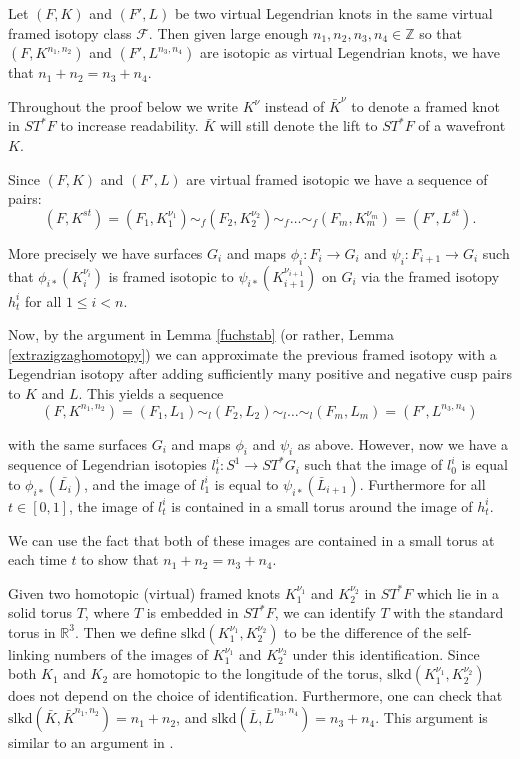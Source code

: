 \begin{thm}\label{sameframediso}
Let $(F, K)$ and $(F', L)$ be two virtual Legendrian knots in the same virtual framed isotopy class $\mathcal{F}$. Then given large enough $n_1, n_2, n_3, n_4 \in \mathbb{Z}$ so that $(F, K^{n_1,n_2})$ and $(F',L^{n_3, n_4})$ are isotopic as virtual Legendrian knots, we have that $n_1+n_2 = n_3+n_4$.
\end{thm}

\pp
Throughout the proof below we write $K^\nu$ instead of $\bar{K}^\nu$ to denote a framed knot in $ST^*F$ to increase readability.  $\bar{K}$ will still denote the lift to $ST^*F$ of a wavefront $K$.

Since $(F,K)$ and $(F',L)$ are virtual framed isotopic we have a sequence of pairs:
$$(F, K^{st}) = (F_1,K_1^{\nu_1}) \sim_f (F_2, K_2^{\nu_2}) \sim_f \dots \sim_f (F_m, K_m^{\nu_m}) = (F', L^{st}).$$

More precisely we have surfaces $G_i$ and maps $\phi_i : F_i \rightarrow G_i$ and $\psi_i:F_{i+1}\rightarrow G_i$ such that $\phi_{i*}(K_i^{\nu_i})$ is framed isotopic to $\psi_{i*}(K_{i+1}^{\nu_{i+1}})$ on $G_i$ via the framed isotopy $h_t^i$ for all $1\leq i < n$.  


Now, by the argument in Lemma \ref{fuchstab} (or rather, Lemma \ref{extrazigzaghomotopy}) we can approximate the previous framed isotopy with a Legendrian isotopy after adding sufficiently many positive and negative cusp pairs to $K$ and $L$.  This yields a sequence
$$(F, K^{n_1,n_2}) = (F_1, L_1)\sim_l (F_2, L_2) \sim_l \dots \sim_l (F_m, L_m)=(F',L^{n_3,n_4})$$

with the same surfaces $G_i$ and maps $\phi_i$ and $\psi_i$ as above. However, now we have a sequence of Legendrian isotopies $l_t^i:S^1\rightarrow ST^*G_i$ such that the image of $l_0^i$ is equal to $\phi_{i*}(\bar{L_i})$,  and the image of $l_1^i $ is equal to $ \psi_{i*}(\bar{L}_{i+1})$.  Furthermore for all $t\in[0,1]$, the image of $l_t^i$ is contained in a small torus around the image of $h_t^i$.

We can use the fact that both of these images are contained in a small torus  at each time $t$ to show that $n_1+n_2 = n_3+n_4$.

Given two homotopic (virtual) framed knots $K_1^{\nu_1}$ and $K_2^{\nu_2}$ in $ST^*F$ which lie in a solid torus $T$, where $T$ is embedded in $ST^*F$, we can identify $T$ with the standard torus in $\mathbb{R}^3$.  Then we define $\text{slkd}(K_1^{\nu_1},K_2^{\nu_2})$ to be the difference of the self-linking numbers of the images of $K_1^{\nu_1}$ and $K_2^{\nu_2}$ under this identification.  Since both $K_1$ and $K_2$ are homotopic to the longitude of the torus, $\text{slkd}(K_1^{\nu_1}, K_2^{\nu_2})$ does not depend on the choice of identification.  Furthermore, one can check that $\text{slkd}(\bar{K},\bar{K}^{n_1,n_2})=n_1+n_2$, and $\text{slkd}(\bar{L},\bar{L}^{n_3,n_4})=n_3+n_4$. This argument is similar to an argument in \cite{Chernov}.

